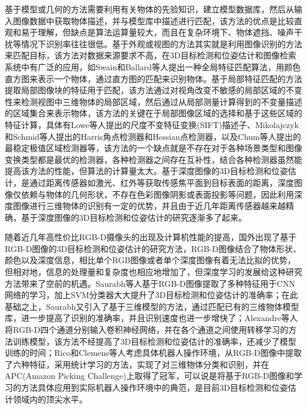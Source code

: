 基于模型或几何的方法需要利用有关物体的先验知识，建立模型数据库，然后从输入图像数据中获取物体描述，并与模型库中描述进行匹配，该方法的优点是比较直观和易于理解，但缺点是算法运算量较大，而且在复杂环境下、物体遮挡、噪声干扰等情况下识别率往往很低。基于外观或视图的方法其实就是利用图像识别的方法来匹配目标，该方法对数据来源要求不高，在3D目标检测和位姿估计和图像检索系统中有广泛的应用，如Swain和Ballard\cite{swain1991color}等人提出一种全局特征匹配算法，用颜色直方图来表示一个物体，通过直方图的匹配来识别物体。基于局部特征匹配的方法提取局部图像块的特征用于匹配，该方法通过对视角改变不敏感的局部区域的不变性来检测视图中三维物体的局部区域，然后通过从局部测量计算得到的不变量描述的区域集合来表示物体，该方法的关键在于局部图像区域的选择和基于这些区域的特征计算，具体有Lowe\cite{lowe1999object}等人提出的尺度不变特征变换(SIFT)描述子、Mikolajczyk和Schmid\cite{matas2004robust}等人提出的Harris角点检测器和Hessian点检测器，以及Chum\cite{chum2004enhancing}等人提出的最稳定极值区域检测器等，该方法的一个缺点就是不存在对于各种场景类型和图像变换类型都是最优的检测器，各种检测器之间存在互补性，结合各种检测器虽然能提高该方法的性能，但算法的计算量太大。基于深度图像的3D目标检测和位姿估计，是通过距离传感器如激光、红外等获取传感焦平面到目标表面的距离，深度图像仅依赖与物体的几何形状，不存在色彩图像阴影或表面投影等问题，因此利用深度图像进行三维物体的识别有一定的优势，并且由于近几年距离传感器越来越精确，基于深度图像的3D目标检测和位姿估计的研究逐渐多了起来。

随着近几年高性价比RGB-D摄像头的出现及计算机性能的提高，国外出现了基于RGB-D图像的3D目标检测和位姿估计的研究方法，RGB-D图像结合了物体形状、颜色以及深度信息，相比单个RGB图像或者单个深度图像有着无法比拟的优势，但相对地，信息的处理量和复杂度也相应地增加了，但深度学习的发展给这种研究方法带来了空前的机遇。Saurabh\cite{Gupta2014}等人基于RGB-D图像提取了多种特征用于CNN网络的学习，加上SVM分类器大大提升了3D目标检测和位姿估计的准确率；在此基础之上，Saurabh又引入了基于三维模型的方法\cite{Gupta2013}，通过匹配已有的三维物体模型库，进一步提高了识别的准确率，并且识别速度也进一步增快了；Alexandre\cite{alexandre20163d}等人将RGB-D四个通道分别输入卷积神经网络，并在各个通道之间使用转移学习的方法训练模型，该方法不经提高了3D目标检测和位姿估计的准确率，还减少了模型训练的时间；Rico和Clemens\cite{jonschkowski2016probabilistic}等人考虑具体机器人操作环境，从RGB-D图像中提取了六种特征，采用统计学习的方法，实现了对三维物体分类和识别，并在APC(Amazon Picking Challenge)上取得了冠军，可以说是将基于RGB-D图像和学习的方法具体应用到实际机器人操作环境中的典范，是目前3D目标检测和位姿估计领域内的顶尖水平。

